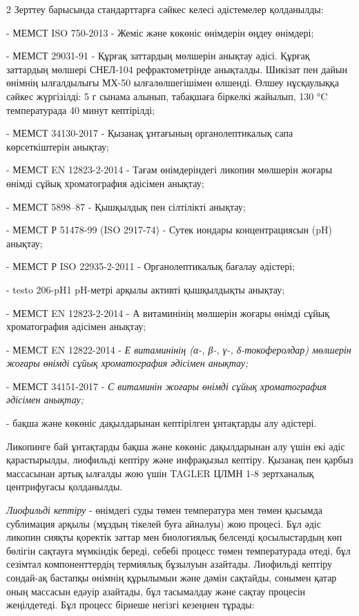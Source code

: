 \begin{multicols}{2}
Зерттеу барысында стандарттарға сәйкес келесі әдістемелер қолданылды:

- МЕМСТ ISO 750-2013 - Жеміс және көкөніс өнімдерін өңдеу
өнімдері;

- МЕМСТ 29031-91 - Құрғақ заттардың мөлшерін анықтау әдісі.
Құрғақ заттардың мөлшері СНЕЛ-104 рефрактометрінде анықталды. Шикізат
пен дайын өнімнің ылғалдылығы МХ-50 ылғалөлшегішімен өлшенді. Өлшеу
нұсқаулыққа сәйкес жүргізілді: 5 г сынама алынып, табақшаға біркелкі
жайылып, 130 °C температурада 40 минут кептірілді;

- МЕМСТ 34130-2017 - Қызанақ ұнтағының
органолептикалық сапа көрсеткіштерін анықтау;

- МЕМСТ EN 12823-2-2014 - Тағам өнімдеріндегі ликопин мөлшерін
жоғары өнімді сұйық хроматография әдісімен анықтау;

- МЕМСТ 5898--87 - Қышқылдық пен сілтілікті анықтау;

- МЕМСТ Р 51478-99 (ISO 2917-74) - Сутек иондары
концентрациясын (pH) анықтау;

- МЕМСТ Р ISO 22935-2-2011 - Органолептикалық бағалау әдістері;

- testo 206-pH1 pH-метрі арқылы активті қышқылдықты анықтау;

- МЕМСТ EN 12823-2-2014 - А витаминінің мөлшерін жоғары өнімді
сұйық хроматография әдісімен анықтау;

- МЕМСТ EN 12822-2014 - \emph{Е витаминінің (α-, β-, γ-,
δ-токоферолдар) мөлшерін жоғары өнімді сұйық хроматография әдісімен
анықтау;}

- МЕМСТ 34151-2017 - \emph{С витаминін жоғары өнімді
сұйық хроматография әдісімен анықтау;}

- бақша және көкөніс дақылдарынан кептірілген ұнтақтарды алу әдістері.

Ликопинге бай ұнтақтарды бақша және көкөніс дақылдарынан алу үшін екі
әдіс қарастырылды, лиофильді кептіру және инфрақызыл кептіру. Қызанақ
пен қарбыз массасынан артық ылғалды жою үшін TAGLER ЦЛМН 1-8 зертханалық
центрифугасы қолданылды.

\emph{Лиофильді кептіру} - өнімдегі суды төмен температура мен төмен
қысымда сублимация арқылы (мұздың тікелей буға айналуы) жою процесі. Бұл
әдіс ликопин сияқты қоректік заттар мен биологиялық белсенді
қосылыстардың көп бөлігін сақтауға мүмкіндік береді, себебі процесс
төмен температурада өтеді, бұл сезімтал компоненттердің термиялық
бұзылуын азайтады. Лиофильді кептіру сондай-ақ бастапқы өнімнің
құрылымын және дәмін сақтайды, сонымен қатар оның массасын едәуір
азайтады, бұл тасымалдау және сақтау процесін жеңілдетеді. Бұл процесс
бірнеше негізгі кезеңнен тұрады:


\end{multicols}
